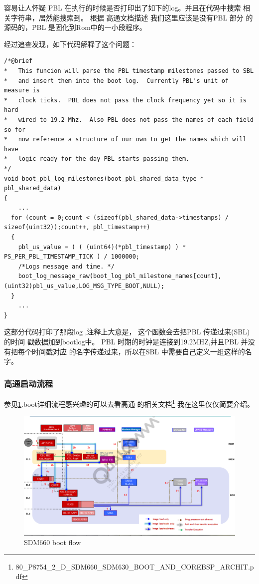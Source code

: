 容易让人怀疑 PBL 在执行的时候是否打印出了如下的log。并且在代码中搜索
相关字符串，居然能搜索到。 根据 高通文档描述 我们这里应该是没有PBL 部分
的源码的，PBL 是固化到Rom中的一小段程序。

经过追查发现，如下代码解释了这个问题：
\begin{lstlisting}
/*@brief
*   This funcion will parse the PBL timestamp milestones passed to SBL
*   and insert them into the boot log.  Currently PBL's unit of measure is
*   clock ticks.  PBL does not pass the clock frequency yet so it is hard
*   wired to 19.2 Mhz.  Also PBL does not pass the names of each field so for
*   now reference a structure of our own to get the names which will have
*   logic ready for the day PBL starts passing them.
*/
void boot_pbl_log_milestones(boot_pbl_shared_data_type * pbl_shared_data)
{
	...
  for (count = 0;count < (sizeof(pbl_shared_data->timestamps) / sizeof(uint32));count++, pbl_timestamp++)
  {
    pbl_us_value = ( ( (uint64)(*pbl_timestamp) ) * PS_PER_PBL_TIMESTAMP_TICK ) / 1000000;
    /*Logs message and time. */
    boot_log_message_raw(boot_log_pbl_milestone_names[count],(uint32)pbl_us_value,LOG_MSG_TYPE_BOOT,NULL);
  }
	...
}
\end{lstlisting}
这部分代码打印了那段log ,注释上大意是， 这个函数会去把PBL 传递过来(SBL)的时间
戳数据加到bootlog中。 PBL 时期的时钟是连接到19.2MHZ,并且PBL 并没有把每个时间戳对应
的名字传递过来，所以在SBL 中需要自己定义一组这样的名字。



\subsubsection{高通启动流程}

参见\ref{sdm660boot}.boot详细流程感兴趣的可以去看高通
的相关文档\footnote{80\_P8754\_2\_D\_SDM660\_SDM630\_BOOT\_AND\_COREBSP\_ARCHIT.pdf}
我在这里仅仅简要介绍。
\begin{figure}[htbp]
\begin{center}
\includegraphics[width=16cm]{img/bootarch}
\caption{SDM660 boot flow}
\label{sdm660boot}
\end{center}
\vspace{-0.5em}
\end{figure}


